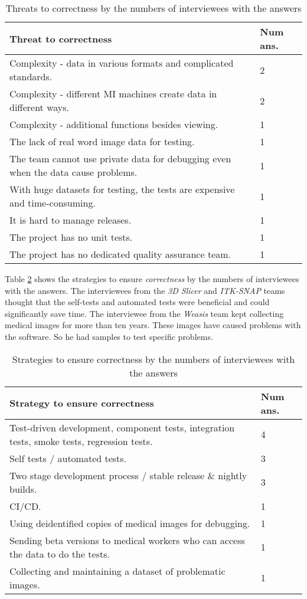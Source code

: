 \begin{table}[H]
\centering
\hspace*{-1cm}\begin{tabular}{ll}
\hline
Threat to correctness & Num ans. \\ \hline
Complexity - data in various formats and complicated standards. & 2 \\
Complexity - different MI machines create data in different ways. & 2 \\
Complexity - additional functions besides viewing. & 1 \\
The lack of real word image data for testing. & 1 \\
The team cannot use private data for debugging even when the data cause problems. & 1 \\
With huge datasets for testing, the tests are expensive and time-consuming. & 1 \\
It is hard to manage releases. & 1 \\
The project has no unit tests. & 1 \\
The project has no dedicated quality assurance team. & 1 \\ \hline
\end{tabular}
\caption{\label{tab_q15_threats_correctness}Threats to correctness by the numbers of interviewees with the answers}
\end{table}

Table \ref{tab_q15_strategies_correctness} shows the strategies to ensure \textit{correctness} by the numbers of interviewees with the answers. The interviewees from the \textit{3D Slicer} and \textit{ITK-SNAP} teams thought that the self-tests and automated tests were beneficial and could significantly save time. The interviewee from the \textit{Weasis} team kept collecting medical images for more than ten years. These images have caused problems with the software. So he had samples to test specific problems.

\begin{table}[H]
\centering
\hspace*{-1.5cm}\begin{tabular}{ll}
\hline
Strategy to ensure correctness & Num ans. \\ \hline
Test-driven development, component tests, integration tests, smoke tests, regression tests. & 4 \\
Self tests / automated tests. & 3 \\
Two stage development process / stable release \& nightly builds. & 3 \\
CI/CD. & 1 \\
Using deidentified copies of medical images for debugging. & 1 \\
Sending beta versions to medical workers who can access the data to do the tests. & 1 \\
Collecting and maintaining a dataset of problematic images. & 1 \\ \hline
\end{tabular}
\caption{\label{tab_q15_strategies_correctness}Strategies to ensure correctness by the numbers of interviewees with the answers}
\end{table}

